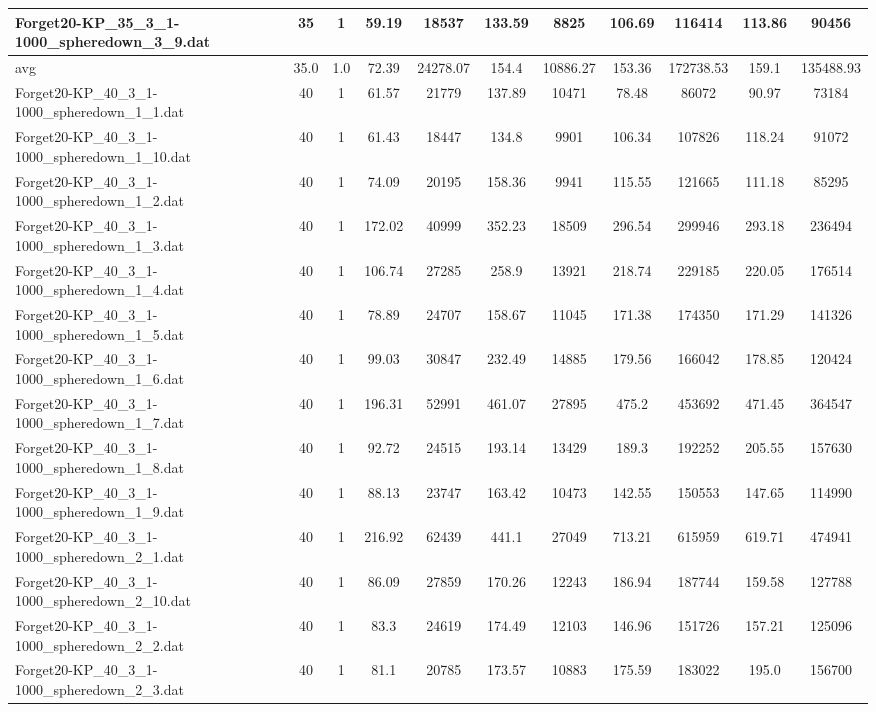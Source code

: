 \begin{table}[!ht]
\begin{tabular}{lcccccccccc}
Forget20-KP\_35\_3\_1-1000\_spheredown\_3\_9.dat & 35 & 1 & 59.19 & 18537 & 133.59 & 8825 & 106.69 & 116414 & 113.86 & 90456 \\
\hline avg & 35.0 & 1.0 & 72.39& 24278.07 & 154.4& 10886.27 & 153.36& 172738.53 & 159.1& 135488.93\\ \hline
Forget20-KP\_40\_3\_1-1000\_spheredown\_1\_1.dat & 40 & 1 & 61.57 & 21779 & 137.89 & 10471 & 78.48 & 86072 & 90.97 & 73184 \\
Forget20-KP\_40\_3\_1-1000\_spheredown\_1\_10.dat & 40 & 1 & 61.43 & 18447 & 134.8 & 9901 & 106.34 & 107826 & 118.24 & 91072 \\
Forget20-KP\_40\_3\_1-1000\_spheredown\_1\_2.dat & 40 & 1 & 74.09 & 20195 & 158.36 & 9941 & 115.55 & 121665 & 111.18 & 85295 \\
Forget20-KP\_40\_3\_1-1000\_spheredown\_1\_3.dat & 40 & 1 & 172.02 & 40999 & 352.23 & 18509 & 296.54 & 299946 & 293.18 & 236494 \\
Forget20-KP\_40\_3\_1-1000\_spheredown\_1\_4.dat & 40 & 1 & 106.74 & 27285 & 258.9 & 13921 & 218.74 & 229185 & 220.05 & 176514 \\
Forget20-KP\_40\_3\_1-1000\_spheredown\_1\_5.dat & 40 & 1 & 78.89 & 24707 & 158.67 & 11045 & 171.38 & 174350 & 171.29 & 141326 \\
Forget20-KP\_40\_3\_1-1000\_spheredown\_1\_6.dat & 40 & 1 & 99.03 & 30847 & 232.49 & 14885 & 179.56 & 166042 & 178.85 & 120424 \\
Forget20-KP\_40\_3\_1-1000\_spheredown\_1\_7.dat & 40 & 1 & 196.31 & 52991 & 461.07 & 27895 & 475.2 & 453692 & 471.45 & 364547 \\
Forget20-KP\_40\_3\_1-1000\_spheredown\_1\_8.dat & 40 & 1 & 92.72 & 24515 & 193.14 & 13429 & 189.3 & 192252 & 205.55 & 157630 \\
Forget20-KP\_40\_3\_1-1000\_spheredown\_1\_9.dat & 40 & 1 & 88.13 & 23747 & 163.42 & 10473 & 142.55 & 150553 & 147.65 & 114990 \\
Forget20-KP\_40\_3\_1-1000\_spheredown\_2\_1.dat & 40 & 1 & 216.92 & 62439 & 441.1 & 27049 & 713.21 & 615959 & 619.71 & 474941 \\
Forget20-KP\_40\_3\_1-1000\_spheredown\_2\_10.dat & 40 & 1 & 86.09 & 27859 & 170.26 & 12243 & 186.94 & 187744 & 159.58 & 127788 \\
Forget20-KP\_40\_3\_1-1000\_spheredown\_2\_2.dat & 40 & 1 & 83.3 & 24619 & 174.49 & 12103 & 146.96 & 151726 & 157.21 & 125096 \\
Forget20-KP\_40\_3\_1-1000\_spheredown\_2\_3.dat & 40 & 1 & 81.1 & 20785 & 173.57 & 10883 & 175.59 & 183022 & 195.0 & 156700 \\

\end{tabular}
\end{table}
